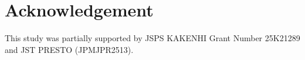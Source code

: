\section*{Acknowledgement}
This study was partially supported by JSPS KAKENHI Grant Number 25K21289 and JST PRESTO (JPMJPR2513).